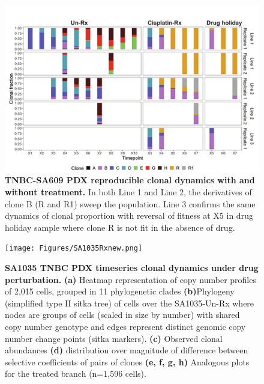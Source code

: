 \begin{figure}
\centering
\includegraphics[width=\textwidth]{Figures/SA609barplotanalysis.pdf}
	
\caption[TNBC-SA609 PDX reproducible clonal dynamics with and without treatment]
	{\small
	\textbf{TNBC-SA609 PDX reproducible clonal dynamics with and without treatment.}
	    In both Line 1 and Line 2, the derivatives of clone B (R and R1) sweep the population. Line 3 confirms the same dynamics of clonal proportion with reversal of fitness at X5 in drug holiday sample where clone R is not fit in the absence of drug.
	}
	\label{fig:SA609barplotanalysis}
\end{figure}

\begin{figure}
\centering
\texttt{[image: Figures/SA1035Rxnew.png]}
	
\caption[SA1035 TNBC PDX timeseries clonal dynamics under drug perturbation]
	{\small
	\textbf{SA1035 TNBC PDX timeseries clonal dynamics under drug perturbation.}
	    \textbf{(a)} Heatmap representation of copy number profiles of
2,015 cells, grouped in 11 phylogenetic clades  \textbf{(b)}Phylogeny (simplified type II sitka tree) of cells over the SA1035-Un-Rx where nodes are groups of cells (scaled in size by number) with shared copy number genotype and edges represent distinct genomic copy number change points (sitka markers). \textbf{(c)} Observed clonal abundances \textbf{(d)} distribution over magnitude of difference between selective coefficients of pairs of clones \textbf{(e, f, g, h)} Analogous plots for the treated branch (n=1,596 cells).
	}
	\label{fig:SA1035Rxnew}
\end{figure}

